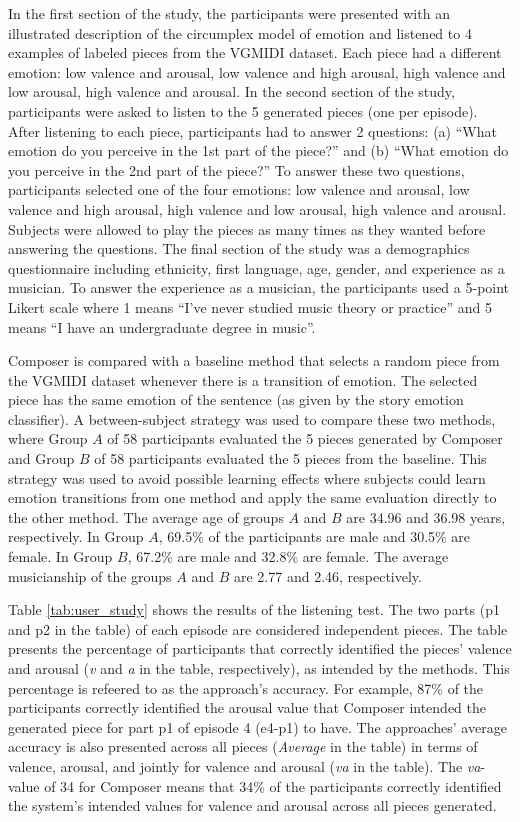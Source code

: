 In the first section of the study, the participants were presented with an illustrated description of the circumplex model of emotion and listened to 4 examples of labeled pieces from the VGMIDI dataset. Each piece had a different emotion: low valence and arousal, low valence and high arousal, high valence and low arousal, high valence and arousal. In the second section of the study, participants were asked to listen to the 5 generated pieces (one per episode). After listening to each piece, participants had to answer 2 questions: (a) ``What emotion do you perceive in the 1st part of the piece?'' and (b) ``What emotion do you perceive in the 2nd part of the piece?'' To answer these two questions, participants selected one of the four emotions: low valence and arousal, low valence and high arousal, high valence and low arousal, high valence and arousal. Subjects were allowed to play the pieces as many times as they wanted before answering the questions.
The final section of the study was a demographics questionnaire including ethnicity, first language, age, gender, and experience as a musician. To answer the experience as a musician, the participants used a 5-point Likert scale where 1 means ``I've never studied music theory or practice'' and 5 means ``I have an undergraduate degree in music''.

Composer is compared with a baseline method that selects a random piece from the VGMIDI dataset whenever there is a transition of emotion. The selected piece has the same emotion of the sentence (as given by the story emotion classifier). A between-subject strategy was used to compare these two methods, where Group $A$ of 58 participants evaluated the 5 pieces generated by Composer and Group $B$ of 58 participants evaluated the 5 pieces from the baseline. This strategy was used to avoid possible learning effects where subjects could learn emotion transitions from one method and apply the same evaluation directly to the other method. The average age of groups $A$ and $B$ are 34.96 and 36.98 years, respectively. In Group $A$, 69.5\% of the participants are male and 30.5\% are female. In Group $B$, 67.2\% are male and 32.8\% are female. The average musicianship of the groups $A$ and $B$ are 2.77 and 2.46, respectively.

Table \ref{tab:user_study} shows the results of the listening test. The two parts (p1 and p2 in the table) of each episode are considered independent pieces. The table presents the percentage of participants that correctly identified the pieces' valence and arousal (\textit{v} and \textit{a} in the table, respectively), as intended by the methods. This percentage is refeered to as the approach's accuracy. For example, 87\% of the participants correctly identified the arousal value that Composer intended the generated piece for part p1 of episode 4 (e4-p1) to have. The approaches' average accuracy is also presented across all pieces (\textit{Average} in the table) in terms of valence, arousal, and jointly for valence and arousal (\textit{va} in the table). The \textit{va}-value of 34 for Composer means that 34\% of the participants correctly identified the system's intended values for valence and arousal across all pieces generated.

